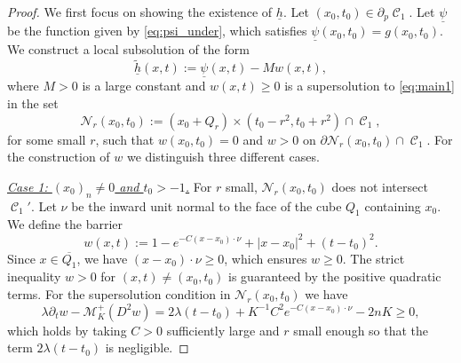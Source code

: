 \documentclass[12pt]{article}
\numberwithin{Theorem}{section}
\theoremstyle{definition}
\theoremstyle{remark}
\numberwithin{equation}{section}
\DeclareMathOperator{\C}{\mathcal{C}}
\newcommand*{\Mp}{\mathcal{M}_{K}^{+}}
\newcommand{\p}{\partial}
\begin{document}
\begin{proof}
We first focus on showing the existence of $\underline{h}$.
    Let $(x_0,t_0) \in \p_p \C_1$. Let $\underline{\psi}$ be the function given by \eqref{eq:psi_under}, which satisfies $\underline{\psi}(x_0,t_0) = g(x_0,t_0)$. We construct a local subsolution of the form
    $$ \underline{\tilde{h}}(x,t) := \underline{\psi}(x,t) - M w(x,t), $$
    where $M > 0$ is a large constant and $w(x,t) \ge 0$ is a supersolution to \eqref{eq:main1} in the set
    \[
    \mathcal{N}_r(x_0, t_0) := (x_0 + Q_r) \times (t_0 - r^2, t_0 + r^2) \cap \C_1,
    \]
    for some small $r$, such that $w(x_0, t_0) = 0$ and $w > 0$ on $\partial \mathcal{N}_r(x_0, t_0) \cap \C_1$. 
    For the construction of $w$ we distinguish three different cases.

   \underline{\textit{Case 1: $(x_0)_n \neq 0$ and $t_0>-1$.}} For $r$ small, $\mathcal{N}_r(x_0, t_0)$ does not intersect $\C_1'$. Let $\nu$ be the inward unit normal to the face of the cube $Q_1$ containing $x_0$. We define the barrier
        $$ w(x,t) := 1 - e^{-C(x-x_0)\cdot \nu} + |x-x_0|^2 + (t - t_0)^2. $$
        Since $x \in \overline{Q_1}$, we have $(x-x_0)\cdot \nu \ge 0$, which ensures $w \ge 0$. The strict inequality $w > 0$ for $(x,t) \neq (x_0, t_0)$ is guaranteed by the positive quadratic terms.
        For the supersolution condition in $\mathcal{N}_{r}(x_0,t_0)$ we have
        $$ \lambda \p_t w - \Mp(D^2 w) = 2\lambda(t-t_0) +  K^{-1} C^2 e^{-C(x-x_0)\cdot \nu} - 2nK \geq 0, $$
       which holds by taking $C > 0$ sufficiently large and $r$ small enough so that the term $2\lambda(t-t_0)$ is negligible.
 

\end{proof}
\end{document}
